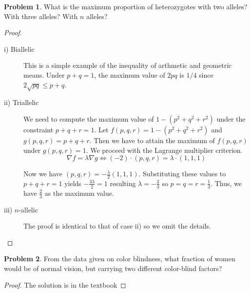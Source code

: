 \documentclass[12pt]{report}
\theoremstyle{definition}
\newtheorem{problem}{Problem}[chapter]
\begin{document}
        \begin{problem}
            What is the maximum proportion of heterozygotes with two alleles? With three alleles? With $n$ alleles?
            \begin{proof}
                
                \begin{description}
                    \item[i) Biallelic]
                This is a simple example of the inequality of arthmetic and geometric means.
                Under $p+q=1$, the maximum value of $2pq$ is $1/4$ since $2 \sqrt{pq} \leq p+q$.

                    \item[ii) Triallelic]
                We need to compute the maximum value of $1-(p^2+q^2+r^2)$ under the constraint $p+q+r=1$. 
                Let $f(p,q,r) = 1-(p^2+q^2+r^2)$ and $g(p,q,r)=p+q+r$.
                Then we have to attain the maximum of $f(p,q,r)$ under $g(p,q,r)=1$.
                We proceed with the Lagrange multiplier criterion. 
                \begin{equation*}
                    \nabla{f} = \lambda \nabla{g} \Leftrightarrow
                    (-2) \cdot (p,q,r) = \lambda \cdot (1,1,1)
                \end{equation*}

                Now we have $(p,q,r) = -\frac{\lambda}{2}(1,1,1)$.
                Substituting these values to $p+q+r=1$ yields $-\frac{3\lambda}{2} = 1 $ resulting $\lambda = -\frac{2}{3}$ so $p=q=r=\frac{1}{3}$.
                Thus, we have $\frac{2}{3}$ as the maximum value.

                    \item[iii) $n$-allelic]
                        The proof is identical to that of case ii) so we omit the details.
                \end{description}
            \end{proof}

        \end{problem}

        \begin{problem}
            From the data given on color blindness, what fraction of women would be of normal vision, but carrying two different color-blind factors?
            \begin{proof}
                The solution is in the textbook
            \end{proof}
        \end{problem}
\end{document}
